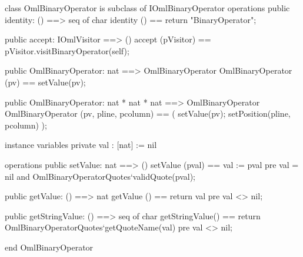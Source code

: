 \begin{vdm_al}
class OmlBinaryOperator is subclass of IOmlBinaryOperator
operations
  public identity: () ==> seq of char
  identity () == return "BinaryOperator";

  public accept: IOmlVisitor ==> ()
  accept (pVisitor) == pVisitor.visitBinaryOperator(self);

  public OmlBinaryOperator: nat ==> OmlBinaryOperator
  OmlBinaryOperator (pv) == setValue(pv);

  public OmlBinaryOperator: nat * nat * nat ==> OmlBinaryOperator
  OmlBinaryOperator (pv, pline, pcolumn) == ( setValue(pv); setPosition(pline, pcolumn) );

instance variables
  private val : [nat] := nil

operations
  public setValue: nat ==> ()
  setValue (pval) == val := pval
    pre val = nil and OmlBinaryOperatorQuotes`validQuote(pval);

  public getValue: () ==> nat
  getValue () == return val
    pre val <> nil;

  public getStringValue: () ==> seq of char
  getStringValue() == return OmlBinaryOperatorQuotes`getQuoteName(val)
    pre val <> nil;

end OmlBinaryOperator
\end{vdm_al}
